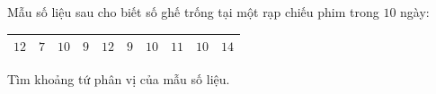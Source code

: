 \begin{ex}
Mẫu số liệu sau cho biết số ghế trống tại một rạp chiếu phim trong $10$ ngày:
\begin{center}
\begin{tabular}{|c|c|c|c|c|c|c|c|c|c|}\hline
$12$ & $7$ & $10$ & $9$ & $12$ & $9$ & $10$ & $11$ & $10$ & $14$\\\hline
\end{tabular}
\end{center}
Tìm khoảng tứ phân vị của mẫu số liệu.
\end{ex}
